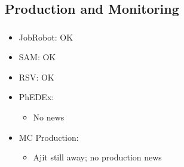 \documentclass{beamer}
\begin{document}
\subsection{Production and Monitoring}
\begin{frame}
\frametitle{}

\begin{itemize}
	\item JobRobot: OK
	\item SAM: OK
	\item RSV: OK
	\item PhEDEx:
	\begin{itemize}
		\item No news
	\end{itemize}
	\item MC Production:
	\begin{itemize}
		\item Ajit still away; no production news
	\end{itemize}
\end{itemize}
\end{frame}
\end{document}

